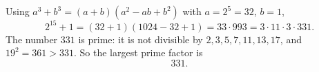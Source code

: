 Using $a^3+b^3=(a+b)(a^2-ab+b^2)$ with $a=2^5=32$, $b=1$,
\[
2^{15}+1=(32+1)(1024-32+1)=33\cdot993=3\cdot11\cdot3\cdot331.
\]
The number $331$ is prime: it is not divisible by $2,3,5,7,11,13,17$, and $19^2=361>331$. So the largest prime factor is
\[\boxed{331}.\]
